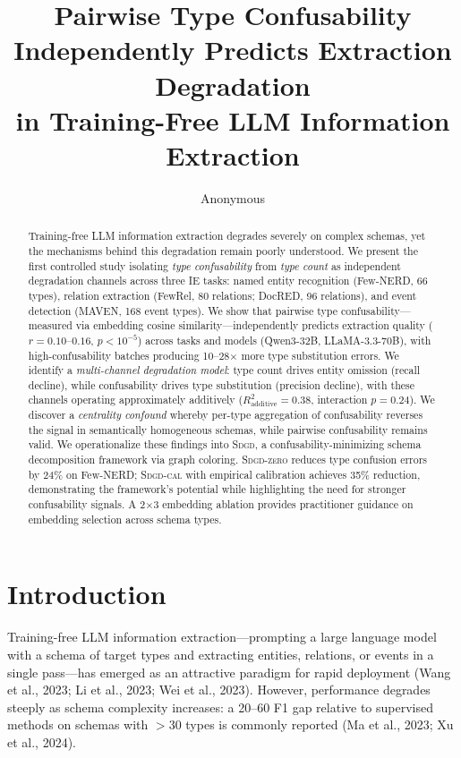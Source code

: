 \documentclass[11pt,a4paper]{article}
\title{Pairwise Type Confusability Independently Predicts Extraction Degradation\\in Training-Free LLM Information Extraction}
\author{Anonymous}
\newcommand{\sdgd}{\textsc{Sdgd}}
\newcommand{\sdgdzero}{\textsc{Sdgd-zero}}
\newcommand{\sdgdcal}{\textsc{Sdgd-cal}}
\begin{document}
\maketitle

\begin{abstract}
Training-free LLM information extraction degrades severely on complex schemas, yet the mechanisms behind this degradation remain poorly understood.
We present the first controlled study isolating \emph{type confusability} from \emph{type count} as independent degradation channels across three IE tasks: named entity recognition (Few-NERD, 66 types), relation extraction (FewRel, 80 relations; DocRED, 96 relations), and event detection (MAVEN, 168 event types).
We show that pairwise type confusability---measured via embedding cosine similarity---independently predicts extraction quality ($r{=}0.10$--$0.16$, $p{<}10^{-5}$) across tasks and models (Qwen3-32B, LLaMA-3.3-70B), with high-confusability batches producing 10--28$\times$ more type substitution errors.
We identify a \emph{multi-channel degradation model}: type count drives entity omission (recall decline), while confusability drives type substitution (precision decline), with these channels operating approximately additively ($R^2_{\text{additive}}{=}0.38$, interaction $p{=}0.24$).
We discover a \emph{centrality confound} whereby per-type aggregation of confusability reverses the signal in semantically homogeneous schemas, while pairwise confusability remains valid.
We operationalize these findings into \sdgd{}, a confusability-minimizing schema decomposition framework via graph coloring.
\sdgdzero{} reduces type confusion errors by 24\% on Few-NERD; \sdgdcal{} with empirical calibration achieves 35\% reduction, demonstrating the framework's potential while highlighting the need for stronger confusability signals.
A 2$\times$3 embedding ablation provides practitioner guidance on embedding selection across schema types.
\end{abstract}

\section{Introduction}
\label{sec:intro}

Training-free LLM information extraction---prompting a large language model with a schema of target types and extracting entities, relations, or events in a single pass---has emerged as an attractive paradigm for rapid deployment (Wang et al., 2023; Li et al., 2023; Wei et al., 2023).
However, performance degrades steeply as schema complexity increases: a 20--60 F1 gap relative to supervised methods on schemas with $>$30 types is commonly reported (Ma et al., 2023; Xu et al., 2024).
\end{document}
